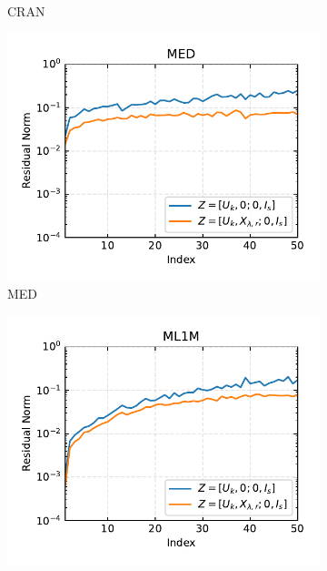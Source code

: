 \begin{figure}[h]
\begin{subfigure}[b]{0.3\textwidth}
        \caption{CRAN}
        \label{fig:single_cran_res_norm}
    \end{subfigure}
    \begin{subfigure}[b]{0.3\textwidth}
        \centering
        \includegraphics[width=\textwidth]{figures/single/med/residual_norms_MED_batch_split_1.pdf}
        \caption{MED}
        \label{fig:single_med_res_norm}
    \end{subfigure}
    \begin{subfigure}[b]{0.3\textwidth}
        \centering
        \includegraphics[width=\textwidth]{figures/single/ml1m/residual_norms_ML1M_batch_split_1.pdf}

\end{subfigure}
\end{figure}
